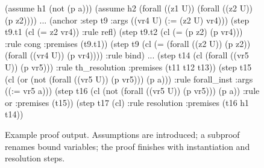\documentclass{scrartcl}
\theoremstyle{definition}
\begin{document}
\begin{figure}[t]
    \begin{AletheVerb}
(assume h1 (not (p a)))
(assume h2 (forall ((z1 U)) (forall ((z2 U)) (p z2))))
...
(anchor :step t9 :args ((vr4 U) (:= (z2 U) vr4)))
(step t9.t1 (cl (= z2 vr4)) :rule refl)
(step t9.t2 (cl (= (p z2) (p vr4)))
         :rule cong :premises (t9.t1))
(step t9 (cl (= (forall ((z2 U)) (p z2))
                (forall ((vr4 U)) (p vr4))))
         :rule bind)
...
(step t14 (cl (forall ((vr5 U)) (p vr5)))
          :rule th_resolution :premises (t11 t12 t13))
(step t15 (cl (or (not (forall ((vr5 U)) (p vr5)))
                  (p a)))
          :rule forall_inst :args ((:= vr5 a)))
(step t16 (cl (not (forall ((vr5 U)) (p vr5))) (p a))
          :rule or :premises (t15))
(step t17 (cl) :rule resolution :premises (t16 h1 t14))
    \end{AletheVerb}
\caption{Example proof output. Assumptions are
  introduced;   a subproof renames bound variables; the proof finishes with
  instantiation and resolution steps.}
\label{fig:proof_ex}
\end{figure}
\end{document}
